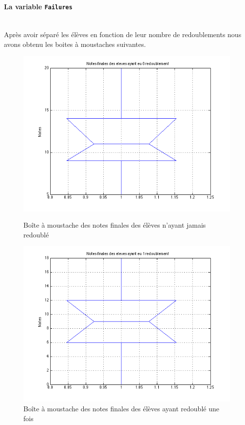 \documentclass[11pt]{article}
\begin{document}
\paragraph{La variable \texttt{Failures}}~\\\indent
Après avoir séparé les élèves en fonction de leur nombre de redoublements nous avons obtenu les boites à moustaches suivantes.
\begin{figure}[h]
\centering
\includegraphics[scale=0.45]{Images/fig25.png}
\caption{Boîte à moustache des notes finales des élèves n'ayant jamais redoublé}
\includegraphics[scale=0.45]{Images/fig26.png}
\caption{Boîte à moustache des notes finales des élèves ayant redoublé une fois}

\end{figure}
\end{document}
